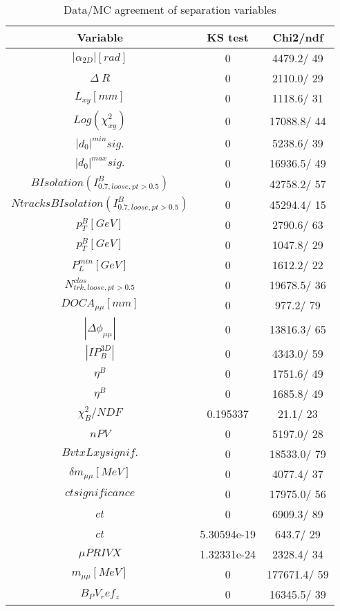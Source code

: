 \documentclass{article}
\begin{document}
\begin{table}[htbp]
\caption{\label{tab:sepVars}Data/MC agreement of separation variables}
\begin{center}
\begin{tabular}{c|c|c}
Variable & KS test & Chi2/ndf \\
\hline
$|\alpha_{2D}| [rad]$ & 0 & 4479.2/ 49\\
\hline
$\Delta~R$ & 0 & 2110.0/ 29\\
\hline
$L_{xy} [mm]$ & 0 & 1118.6/ 31\\
\hline
$Log(\chi^{2}_{xy})$ & 0 & 17088.8/ 44\\
\hline
$|d_{0}|^{min} sig.$ & 0 & 5238.6/ 39\\
\hline
$|d_{0}|^{max} sig.$ & 0 & 16936.5/ 49\\
\hline
$B Isolation (I^{B}_{0.7, loose, pt>0.5})$ & 0 & 42758.2/ 57\\
\hline
$Ntracks B Isolation (I^{B}_{0.7, loose, pt>0.5})$ & 0 & 45294.4/ 15\\
\hline
$p_{T}^{B} [GeV]$ & 0 & 2790.6/ 63\\
\hline
$p_{T}^{B} [GeV]$ & 0 & 1047.8/ 29\\
\hline
$P^{min}_{L} [GeV]$ & 0 & 1612.2/ 22\\
\hline
$N^{clos}_{trk, loose, pt>0.5}$ & 0 & 19678.5/ 36\\
\hline
$DOCA_{\mu\mu} [mm]$ & 0 & 977.2/ 79\\
\hline
$|\Delta\phi_{\mu\mu}|$ & 0 & 13816.3/ 65\\
\hline
$|IP_{B}^{3D}|$ & 0 & 4343.0/ 59\\
\hline
$\eta^{B}$ & 0 & 1751.6/ 49\\
\hline
$\eta^{B}$ & 0 & 1685.8/ 49\\
\hline
$\chi^{2}_{B}/NDF$ & 0.195337 &  21.1/ 23\\
\hline
$nPV$ & 0 & 5197.0/ 28\\
\hline
$BvtxLxy signif.$ & 0 & 18533.0/ 79\\
\hline
$\delta m_{\mu\mu} [MeV]$ & 0 & 4077.4/ 37\\
\hline
$ct significance$ & 0 & 17975.0/ 56\\
\hline
$ct$ & 0 & 6909.3/ 89\\
\hline
$ct$ & 5.30594e-19 & 643.7/ 29\\
\hline
$\mu PRIVX$ & 1.32331e-24 & 2328.4/ 34\\
\hline
$m_{\mu\mu} [MeV]$ & 0 & 177671.4/ 59\\
\hline
$B_PV_ref_z$ & 0 & 16345.5/ 39\\

\end{tabular}
\end{center}
\end{table}
\end{document}
